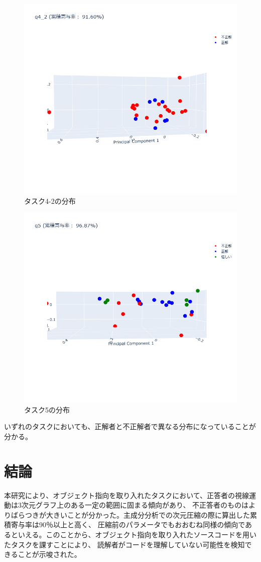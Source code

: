 \documentclass[paper=a4paper,fontsize=11pt]{jlreq}
\begin{document}
    \begin{figure}[htbp]
      \centering
      \includegraphics[width=0.8\linewidth]{3dplot_q4_2.png}
      \caption{タスク4-2の分布}
    \end{figure}
    \FloatBarrier
    \begin{figure}[htbp]
      \centering
      \includegraphics[width=0.8\linewidth]{3dplot_q5.png}
      \caption{タスク5の分布}
    \end{figure}
    \FloatBarrier

    いずれのタスクにおいても、正解者と不正解者で異なる分布になっていることが分かる。

\clearpage    

\part{結論}
本研究により、オブジェクト指向を取り入れたタスクにおいて、正答者の視線運動は3次元グラフ上のある一定の範囲に固まる傾向があり、
不正答者のものはよりばらつきが大きいことが分かった。主成分分析での次元圧縮の際に算出した累積寄与率は90％以上と高く、
圧縮前のパラメータでもおおむね同様の傾向であるといえる。このことから、オブジェクト指向を取り入れたソースコードを用いたタスクを課すことにより、
読解者がコードを理解していない可能性を検知できることが示唆された。
\end{document}
